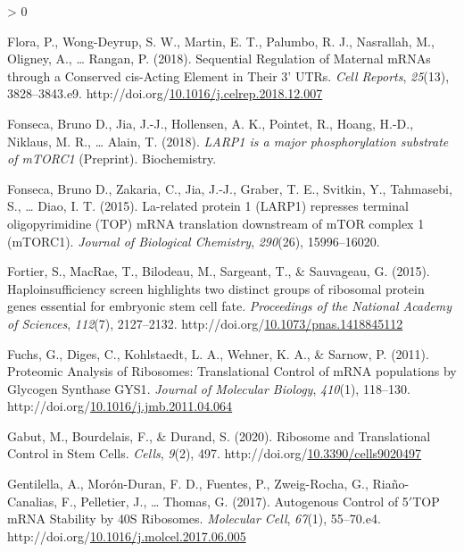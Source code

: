 \documentclass[12pt,oneside]{reedthesis}
\newlength{\cslhangindent}
\newenvironment{CSLReferences}[2] %
 {%
  \setlength{\parindent}{0pt}
  \ifodd #1 \everypar{\setlength{\hangindent}{\cslhangindent}}\ignorespaces\fi
  \ifnum #2 > 0
  \setlength{\parskip}{#2\baselineskip}
  \fi
 }%
 {}
\begin{document}
\begin{CSLReferences}{1}{0}
\leavevmode\hypertarget{ref-Flora2018k}{}%
Flora, P., Wong-Deyrup, S. W., Martin, E. T., Palumbo, R. J., Nasrallah, M., Oligney, A., \ldots{} Rangan, P. (2018). Sequential {Regulation} of {Maternal mRNAs} through a {Conserved} cis-{Acting Element} in {Their} 3' {UTRs}. \emph{Cell Reports}, \emph{25}(13), 3828--3843.e9. http://doi.org/\href{https://doi.org/10.1016/j.celrep.2018.12.007}{10.1016/j.celrep.2018.12.007}

\leavevmode\hypertarget{ref-fonsecaLARP1MajorPhosphorylation2018}{}%
Fonseca, Bruno D., Jia, J.-J., Hollensen, A. K., Pointet, R., Hoang, H.-D., Niklaus, M. R., \ldots{} Alain, T. (2018). \emph{{LARP1} is a major phosphorylation substrate of {mTORC1}} (Preprint). {Biochemistry}.

\leavevmode\hypertarget{ref-Fonseca2015a}{}%
Fonseca, Bruno D., Zakaria, C., Jia, J.-J., Graber, T. E., Svitkin, Y., Tahmasebi, S., \ldots{} Diao, I. T. (2015). La-related protein 1 ({LARP1}) represses terminal oligopyrimidine ({TOP}) {mRNA} translation downstream of {mTOR} complex 1 ({mTORC1}). \emph{Journal of Biological Chemistry}, \emph{290}(26), 15996--16020.

\leavevmode\hypertarget{ref-fortierHaploinsufficiencyScreenHighlights2015}{}%
Fortier, S., MacRae, T., Bilodeau, M., Sargeant, T., \& Sauvageau, G. (2015). Haploinsufficiency screen highlights two distinct groups of ribosomal protein genes essential for embryonic stem cell fate. \emph{Proceedings of the National Academy of Sciences}, \emph{112}(7), 2127--2132. http://doi.org/\href{https://doi.org/10.1073/pnas.1418845112}{10.1073/pnas.1418845112}

\leavevmode\hypertarget{ref-fuchsProteomicAnalysisRibosomes2011}{}%
Fuchs, G., Diges, C., Kohlstaedt, L. A., Wehner, K. A., \& Sarnow, P. (2011). Proteomic {Analysis} of {Ribosomes}: {Translational Control} of {mRNA} populations by {Glycogen Synthase GYS1}. \emph{Journal of Molecular Biology}, \emph{410}(1), 118--130. http://doi.org/\href{https://doi.org/10.1016/j.jmb.2011.04.064}{10.1016/j.jmb.2011.04.064}

\leavevmode\hypertarget{ref-gabutRibosomeTranslationalControl2020}{}%
Gabut, M., Bourdelais, F., \& Durand, S. (2020). Ribosome and {Translational Control} in {Stem Cells}. \emph{Cells}, \emph{9}(2), 497. http://doi.org/\href{https://doi.org/10.3390/cells9020497}{10.3390/cells9020497}

\leavevmode\hypertarget{ref-gentilellaAutogenousControlTOP2017}{}%
Gentilella, A., Morón-Duran, F. D., Fuentes, P., Zweig-Rocha, G., Riaño-Canalias, F., Pelletier, J., \ldots{} Thomas, G. (2017). Autogenous {Control} of 5{\({'}\)}{TOP mRNA Stability} by {40S Ribosomes}. \emph{Molecular Cell}, \emph{67}(1), 55--70.e4. http://doi.org/\href{https://doi.org/10.1016/j.molcel.2017.06.005}{10.1016/j.molcel.2017.06.005}


\end{CSLReferences}
\end{document}
